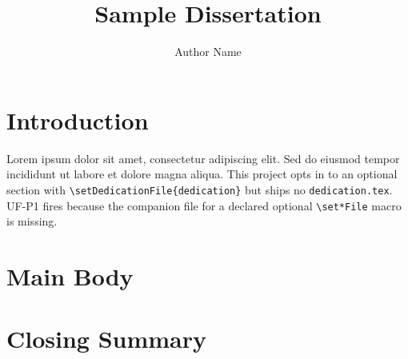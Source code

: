 \documentclass{ufdissertation}
\title{Sample Dissertation}
\author{Author Name}
\begin{document}
\chapter{Introduction}
Lorem ipsum dolor sit amet, consectetur adipiscing elit. Sed do
eiusmod tempor incididunt ut labore et dolore magna aliqua. This
project opts in to an optional section with \texttt{\textbackslash{}setDedicationFile\{dedication\}}
but ships no \texttt{dedication.tex}. UF-P1 fires because the companion
file for a declared optional \texttt{\textbackslash{}set*File} macro is missing.
\chapter{Main Body}
\chapter{Closing Summary}
\end{document}
